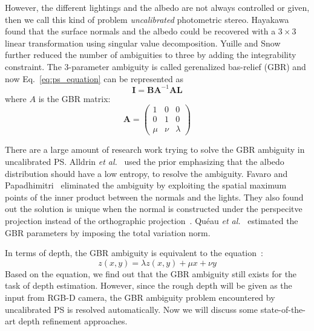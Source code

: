 However, the different lightings and the albedo are not always controlled or given, then we call this kind of problem \emph{uncalibrated} photometric stereo. 
Hayakawa~\cite{hayakawa1994photometric} found that the surface normals and the albedo could be recovered with a $3\times3$ linear transformation using singular value decomposition. Yuille and Snow~\cite{yuille1997shape} further reduced the number of ambiguities to three by adding the integrability constraint.
The 3-parameter ambiguity is called gerenalized bas-relief (GBR) and now Eq.~\ref{eq:ps_equation} can be represented as
\begin{equation}\label{eq:ps_gbr}
    \mathbf{I} = \mathbf{B}\mathbf{A}^{-1}\mathbf{A}\mathbf{L}    
\end{equation}
where $A$ is the GBR matrix:
\begin{equation}
    \mathbf{A} = 
    \begin{pmatrix}
        1& 0 & 0\\
        0& 1 & 0\\
        \mu & \nu & \lambda
    \end{pmatrix}
\end{equation}

There are a large amount of research work trying to solve the GBR ambiguity in uncalibrated PS.
Alldrin \emph{et al.}~\cite{alldrin2007resolving} used the prior emphasizing that the albedo distribution should have a low entropy, to resolve the ambiguity.
Favaro and Papadhimitri~\cite{papadhimitri2014closed} eliminated the ambiguity by exploiting the spatial maximum points of the inner product between the normals and the lights.
They also found out the solution is unique when the normal is constructed under the perspecitve projection instead of the orthographic projection~\cite{papadhimitri2013new}.
Qu\'{e}au \emph{et al.}~\cite{queau2015solving} estimated the GBR parameters by imposing the total variation norm.

In terms of depth, the GBR ambiguity is equivalent to the equation~\cite{queau2015solving}:
\begin{equation}
    z(x,y) = \lambda z(x,y) + \mu x + \nu y
\end{equation}
Based on the equation, we find out that the GBR ambiguity still exists for the task of depth estimation.
However, since the rough depth will be given as the input from RGB-D camera, the GBR ambiguity problem encountered by uncalibrated PS is resolved automatically.  
Now we will discuss some state-of-the-art depth refinement approaches.

